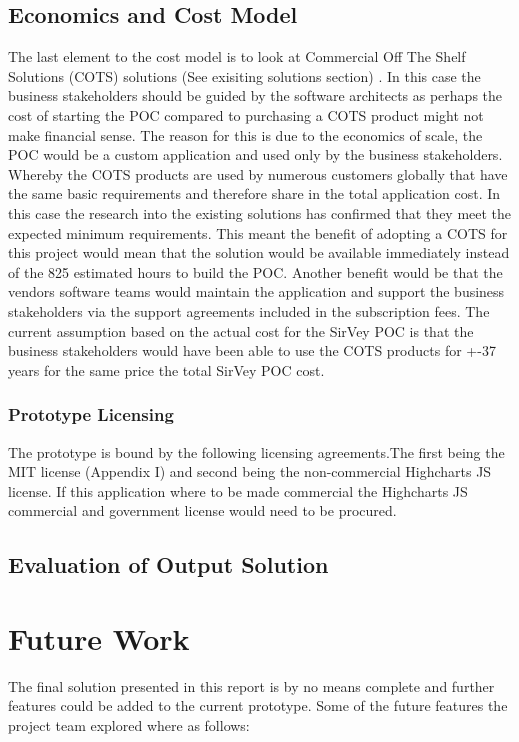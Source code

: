 \documentclass[12pt]{witseiepaper}
\begin{document}
\subsection{Economics and Cost Model}

The last element to the cost model is to look at Commercial Off The Shelf Solutions (COTS) solutions (See exisiting solutions section) \cite{ExpertJudgement}. In this case the business stakeholders should be guided by the software architects as perhaps the cost of starting the POC compared to purchasing a COTS product might not make financial sense. The reason for this is due to the economics of scale, the POC would be a custom application and used only by the business stakeholders. Whereby the COTS products are used by numerous customers globally that have the same basic requirements and therefore share in the total application cost. In this case the research into the existing solutions has confirmed that they meet the expected minimum requirements. This meant the benefit of adopting a COTS for this project would mean that the solution would be available immediately instead of the 825 estimated hours to build the POC. Another benefit would be that the vendors software teams would maintain the application and support the business stakeholders via the support agreements included in the subscription fees. The current assumption based on the actual cost for the SirVey POC is that the business stakeholders would have been able to use the COTS products for +-37 years for the same price the total SirVey POC cost.


\subsubsection{Prototype Licensing}

The prototype is bound by the following licensing agreements.The first being the MIT license (Appendix I) and second being the non-commercial Highcharts JS license. If this application where to be made commercial the Highcharts JS commercial and government license would need to be procured.

\subsection{Evaluation of Output Solution}


\section{Future Work}
The final solution presented in this report is by no means complete and further features could be added to the current prototype. Some of the future features the project team explored where as follows:
\end{document}
